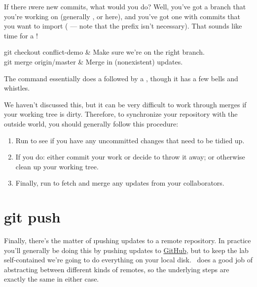 \documentclass[letterpaper, 12pt, titlepage, twoside]{article}
\begin{document}

If there \i{were} new commits, what would you do? Well, you've got a branch
that you're working on (generally , or  here), and
you've got one with commits that you want to import ( ---
note that the  prefix isn't necessary). That sounds like time for
a !

\begin{typeme}
git checkout conflict-demo & Make sure we're on the right branch. \\
git merge origin/master & Merge in (nonexistent) updates.
\end{typeme}

The command  essentially does a  followed by a
, though it has a few bells and whistles.


We haven't discussed this, but it can be very difficult to work through merges
if your working tree is dirty. Therefore, to synchronize your repository with
the outside world, you should generally follow this procedure:

\begin{enumerate}
\item Run  to see if you have any uncommitted changes that need to
  be tidied up.
\item If you do: either commit your work or decide to throw it away; or
  otherwise clean up your working tree.
\item Finally, run  to fetch and merge any updates
  from your collaborators.
\end{enumerate}


\section{git push}

Finally, there's the matter of \i{pushing} updates to a remote repository. In
practice you'll generally be doing this by pushing updates to
\href{https://github.com/}{GitHub}, but to keep the lab self-contained we're
going to do everything on your local disk. \git\ does a good job of
abstracting between different kinds of remotes, so the underlying steps are
exactly the same in either case.
\end{document}
